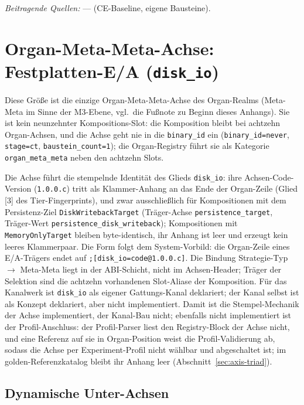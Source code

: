 \emph{Beitragende Quellen:} --- (CE-Baseline, eigene Bausteine).

\section{Organ-Meta-Meta-Achse: Festplatten-E/A (\texttt{disk\_io})}\label{sec:app-blocks-disk-io}

Diese Größe ist die einzige Organ-Meta-Meta-Achse des Organ-Realms (Meta-Meta im Sinne der M3-Ebene, vgl.\ die Fußnote zu Beginn dieses Anhangs). Sie ist kein neunzehnter Kompositions-Slot: die Komposition bleibt bei achtzehn Organ-Achsen, und die Achse geht nie in die \texttt{binary\_\allowbreak{}id} ein (\texttt{binary\_\allowbreak{}id=never}, \texttt{stage=ct}, \texttt{baustein\_\allowbreak{}count=1}); die Organ-Registry führt sie als Kategorie \texttt{organ\_\allowbreak{}meta\_\allowbreak{}meta} neben den achtzehn Slots.

Die Achse führt die stempelnde Identität des Glieds \texttt{disk\_\allowbreak{}io}: ihre Achsen-Code-Version (\texttt{1.0.0.c}) tritt als Klammer-Anhang an das Ende der Organ-Zeile (Glied [3] des Tier-Fingerprints), und zwar ausschließlich für Kompositionen mit dem Persistenz-Ziel \texttt{Disk\allowbreak{}Writeback\allowbreak{}Target} (Träger-Achse \texttt{persistence\_\allowbreak{}target}, Träger-Wert \texttt{persistence\_\allowbreak{}disk\_\allowbreak{}writeback}); Kompositionen mit \texttt{Memory\allowbreak{}Only\allowbreak{}Target} bleiben byte-identisch, ihr Anhang ist leer und erzeugt kein leeres Klammerpaar. Die Form folgt dem System-Vorbild: die Organ-Zeile eines E/A-Trägers endet auf \texttt{;[disk\_\allowbreak{}io=code@1.0.0.c]}. Die Bindung Strategie-Typ $\rightarrow$ Meta-Meta liegt in der ABI-Schicht, nicht im Achsen-Header; Träger der Selektion sind die achtzehn vorhandenen Slot-Aliase der Komposition. Für das Kanalwerk ist \texttt{disk\_\allowbreak{}io} als eigener Gattungs-Kanal deklariert; der Kanal selbst ist als Konzept deklariert, aber nicht implementiert.
Damit ist die Stempel-Mechanik der Achse implementiert, der Kanal-Bau nicht; ebenfalls nicht implementiert ist der Profil-Anschluss: der Profil-Parser liest den Registry-Block der Achse nicht, und eine Referenz auf sie in Organ-Position weist die Profil-Validierung ab, sodass die Achse per Experiment-Profil nicht wählbar und abgeschaltet ist; im golden-Referenzkatalog bleibt ihr Anhang leer (Abschnitt~\ref{sec:axis-triad}).

\subsection*{Dynamische Unter-Achsen}

